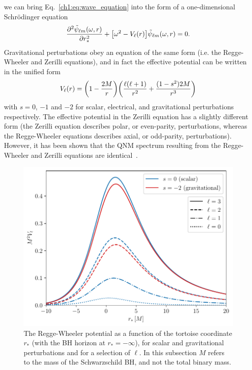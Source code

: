 we can bring Eq.~\ref{ch1:eq:wave_equation} into the form of a one-dimensional Schr\"{o}dinger equation
\begin{equation}\label{ch1:eq:fd_wave_equation}
    \pdv[2]{\tilde{\psi}_{\ell m}(\omega,r)}{r_*} + \qty[ \omega^2 - V_\ell(r)] \tilde{\psi}_{\ell m}(\omega,r) = 0.
\end{equation}
Gravitational perturbations obey an equation of the same form (i.e. the Regge-Wheeler and Zerilli equations), and in fact the effective potential can be written in the unified form
\begin{equation}
    V_\ell(r) = \qty( 1 - \frac{2M}{r} ) \qty( \frac{\ell (\ell + 1)}{r^2} + \frac{(1 - s^2)2M}{r^3} )
\end{equation}
with $s = 0$, $-1$ and $-2$ for scalar, electrical, and gravitational perturbations respectively. 
The effective potential in the Zerilli equation has a slightly different form (the Zerilli equation describes polar, or even-parity, perturbations, whereas the Regge-Wheeler equations describes axial, or odd-parity, perturbations). 
However, it has been shown that the QNM spectrum resulting from the Regge-Wheeler and Zerilli equations are identical~\cite{Chandrasekhar:1975nkd}.

\begin{figure}[t]
    \centering
    \includegraphics[width=0.6\columnwidth]{Figures/Introduction/rw_potential.pdf}
    \caption[Regge-Wheeler potential]{
    The Regge-Wheeler potential as a function of the tortoise coordinate $r_*$ (with the BH horizon at $r_* = -\infty$), for scalar and gravitational perturbations and for a selection of $\ell$. In this subsection $M$ refers to the mass of the Schwarzschild BH, and not the total binary mass.
    }
    \label{ch1:fig:rw_potential}
\end{figure}

